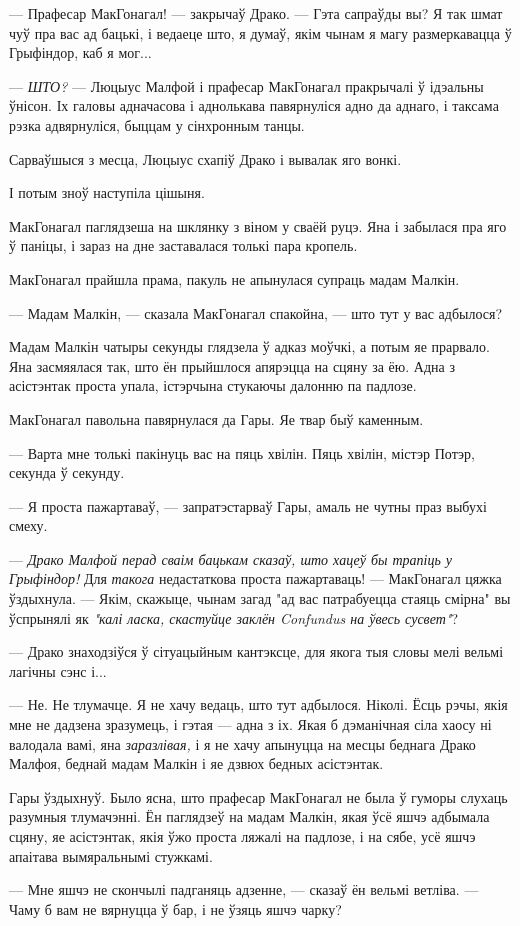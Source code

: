 --- Прафесар МакГонагал! --- закрычаў Драко. --- Гэта сапраўды вы? Я так шмат чуў пра вас ад бацькі,
і ведаеце што, я думаў, якім чынам я магу размеркавацца ў Грыфіндор, каб я мог...

--- \emph{ШТО?} --- Люцыус Малфой і прафесар МакГонагал пракрычалі ў ідэальны ўнісон. Іх галовы
адначасова і аднолькава павярнуліся адно да аднаго, і таксама рэзка адвярнуліся, быццам у
сінхронным танцы.

Сарваўшыся з месца, Люцыус схапіў Драко і вывалак яго вонкі.

І потым зноў наступіла цішыня.

МакГонагал паглядзеша на шклянку з віном у сваёй руцэ. Яна і забылася пра яго ў паніцы, і зараз на дне 
 заставалася толькі пара кропель.

МакГонагал прайшла прама, пакуль не апынулася супраць мадам Малкін.

--- Мадам Малкін, --- сказала МакГонагал спакойна, --- што тут у вас адбылося?

Мадам Малкін чатыры секунды глядзела ў адказ моўчкі, а потым яе прарвало. Яна засмяялася так, што 
ён прыйшлося апярэцца на сцяну за ёю. Адна з асістэнтак проста упала, істэрчына
стукаючы далонню па падлозе. 

МакГонагал павольна павярнулася да Гары. Яе твар быў каменным.

--- Варта мне толькі пакінуць вас на пяць хвілін. Пяць хвілін, містэр Потэр, секунда ў секунду.

--- Я проста пажартаваў, --- запратэстарваў Гары, амаль не чутны праз выбухі смеху.

--- \emph{Драко Малфой перад сваім бацькам сказаў, што хацеў бы трапіць у Грыфіндор!}
Для \emph{такога} недастаткова проста пажартаваць! --- МакГонагал цяжка ўздыхнула. --- 
Якім, скажыце, чынам загад "ад вас патрабуецца стаяць смірна" вы ўспрынялі як 
\emph{"калі ласка, скастуйце заклён Confundus на ўвесь сусвет"}?

--- Драко знаходзіўся ў сітуацыйным кантэксце, для якога тыя словы мелі вельмі
лагічны сэнс і...

--- Не. Не тлумачце. Я не хачу ведаць, што тут адбылося. Ніколі. Ёсць рэчы, якія мне 
не дадзена зразумець, і гэтая --- адна з іх. Якая б дэманічная сіла хаосу ні валодала вамі,
яна \emph{заразлівая,} і я не хачу апынуцца на месцы беднага Драко Малфоя, беднай мадам 
Малкін і яе дзвюх бедных асістэнтак.

Гары ўздыхнуў. Было ясна, што прафесар МакГонагал не была ў гуморы слухаць разумныя тлумачэнні.
Ён паглядзеў на мадам Малкін, якая ўсё яшчэ адбымала сцяну, яе асістэнтак, якія ўжо
проста ляжалі на падлозе, і на сябе, усё яшчэ апаітава вымяральнымі стужкамі.

--- Мне яшчэ не скончылі падганяць адзенне, --- сказаў ён вельмі ветліва. --- Чаму б вам
не вярнуцца ў бар, і не ўзяць яшчэ чарку?

